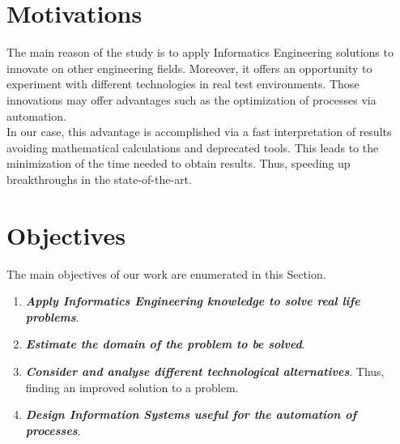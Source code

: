 
\section{Motivations}

The main reason of the study is to apply Informatics Engineering solutions to innovate on other engineering fields. Moreover, it offers an opportunity to experiment with different technologies in real test environments. Those innovations may offer advantages such as the optimization of processes via automation. \\ 

In our case, this advantage is accomplished via a fast interpretation of results avoiding mathematical calculations and deprecated tools. This leads to the minimization of the time needed to obtain results. Thus, speeding up breakthroughs in the state-of-the-art. \\


\section{Objectives}

The main objectives of our work are enumerated in this Section.

\begin{enumerate}

\item \textbf{\textit{Apply Informatics Engineering knowledge to solve real life problems}}.

\item \textbf{\textit{Estimate the domain of the problem to be solved}}. 

\item \textbf{\textit{Consider and analyse different technological alternatives}}. Thus, finding an improved solution to a problem. 

\item \textbf{\textit{Design Information Systems useful for the automation of processes}}.

\end{enumerate}

